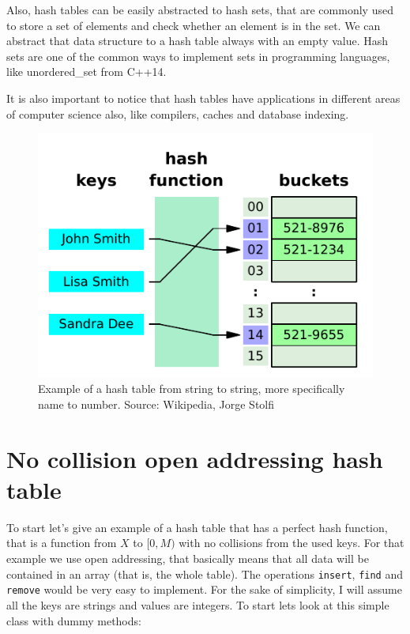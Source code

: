\newpage

Also, hash tables can be easily abstracted to hash sets, that are commonly used to store a set of elements and check whether an element is in the set. We can abstract that data structure to a hash table always with an empty value. Hash sets are one of the common ways to implement sets in programming languages, like unordered\_set from C++14.

It is also important to notice that hash tables have applications in different areas of computer science also, like compilers, caches and database indexing.


\begin{figure}[h!]
  \centering
  \includegraphics[width=12cm]{figuras/hash-table.pdf}
  \caption{Example of a hash table from string to string, more specifically name to number. Source: Wikipedia, Jorge Stolfi }
\end{figure}


\newpage

\section{No collision open addressing hash table }

To start let's give an example of a hash table that has a perfect hash function, that is a function from \( X \) to \( [0, M) \) with no collisions from the used keys. For that example we use open addressing, that basically means that all data will be contained in an array (that is, the whole table). The operations \texttt{insert}, \texttt{find} and \texttt{remove} would be very easy to implement. For the sake of simplicity, I will assume all the keys are strings and values are integers. To start lets look at this simple class with dummy methods:

